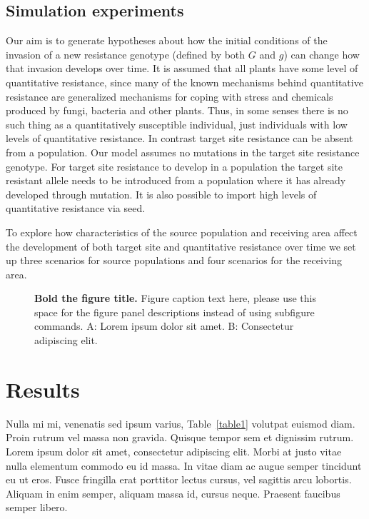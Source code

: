 \documentclass[10pt,letterpaper]{article}
\begin{document}
\subsection*{Simulation experiments}
Our aim is to generate hypotheses about how the initial conditions of the invasion of a new resistance genotype (defined by both $G$ and $g$) can change how that invasion develops over time. It is assumed that all plants have some level of quantitative resistance, since many of the known mechanisms behind quantitative resistance are generalized mechanisms for coping with stress and chemicals produced by fungi, bacteria and other plants. Thus, in some senses there is no such thing as a quantitatively susceptible individual, just individuals with low levels of quantitative resistance. In contrast target site resistance can be absent from a population. Our model assumes no mutations in the target site resistance genotype. For target site resistance to develop in a population the target site resistant allele needs to be introduced from a population where it has already developed through mutation. It is also possible to import high levels of quantitative resistance via seed. 

To explore how characteristics of the source population and receiving area affect the development of both target site and quantitative resistance over time we set up three scenarios for source populations and four scenarios for the receiving area.        

\begin{figure}[!h]
\caption{{\bf Bold the figure title.}
Figure caption text here, please use this space for the figure panel descriptions instead of using subfigure commands. A: Lorem ipsum dolor sit amet. B: Consectetur adipiscing elit.}
\label{fig1}
\end{figure}

\section*{Results}
Nulla mi mi, venenatis sed ipsum varius, Table~\ref{table1} volutpat euismod diam. Proin rutrum vel massa non gravida. Quisque tempor sem et dignissim rutrum. Lorem ipsum dolor sit amet, consectetur adipiscing elit. Morbi at justo vitae nulla elementum commodo eu id massa. In vitae diam ac augue semper tincidunt eu ut eros. Fusce fringilla erat porttitor lectus cursus, vel sagittis arcu lobortis. Aliquam in enim semper, aliquam massa id, cursus neque. Praesent faucibus semper libero.
\end{document}
